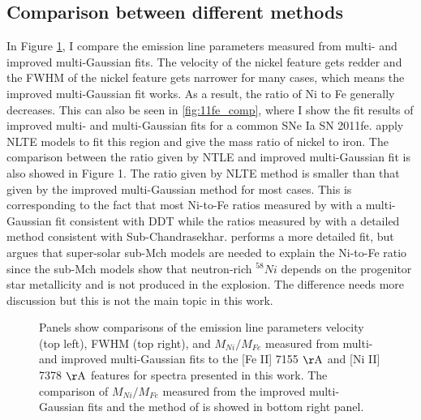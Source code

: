 \documentclass[twocolumn]{aastex631}
\begin{document}
\subsection{Comparison between different methods \label{subsec:compare_method}}

In Figure \ref{fig:method_comp}, I compare the emission line parameters measured from multi- and improved multi-Gaussian fits. The velocity of the nickel feature gets redder and the FWHM of the nickel feature gets narrower for many cases, which means the improved multi-Gaussian fit works. As a result, the ratio of Ni to Fe generally decreases. This can also be seen in \ref{fig:11fe_comp}, where I show the fit results of improved multi- and multi-Gaussian fits for a common SNe Ia SN 2011fe. \citep{2020MNRAS.491.2902F} apply NLTE models to fit this region and give the mass ratio of nickel to iron. The comparison between the ratio given by NTLE and improved multi-Gaussian fit is also showed in Figure 1. The ratio given by NLTE method is smaller than that given by the improved multi-Gaussian method for most cases. This is corresponding to the fact that most Ni-to-Fe ratios measured by \citet{2018MNRAS.477.3567M} with a multi-Gaussian fit consistent with DDT while the ratios measured by \citep{2020MNRAS.491.2902F} with a detailed method consistent with Sub-Chandrasekhar. \citep{2020MNRAS.491.2902F} performs a more detailed fit, but \citet{2018MNRAS.477.3567M} argues that super-solar sub-Mch models are needed to explain the Ni-to-Fe ratio since the sub-Mch models \citep{2010ApJ...714L..52S,2018ApJ...854...52S} show that neutron-rich $^{58}Ni$ depends on the progenitor star metallicity and is not produced in the explosion. The difference needs more discussion but this is not the main topic in this work.

\begin{figure}[ht!]
\caption{Panels show comparisons of the emission line parameters velocity (top left), FWHM (top right), and $M_{Ni}/M_{Fe}$ measured from multi- and improved multi-Gaussian fits to the [Fe II] 7155 $\rm \AA$ and [Ni II] 7378 $\rm \AA$ features for spectra presented in this work. The comparison of $M_{Ni}/M_{Fe}$ measured from the improved multi-Gaussian fits and the method of \citet{2020MNRAS.491.2902F} is showed in bottom right panel.}
\label{fig:method_comp}
\end{figure}
\end{document}

